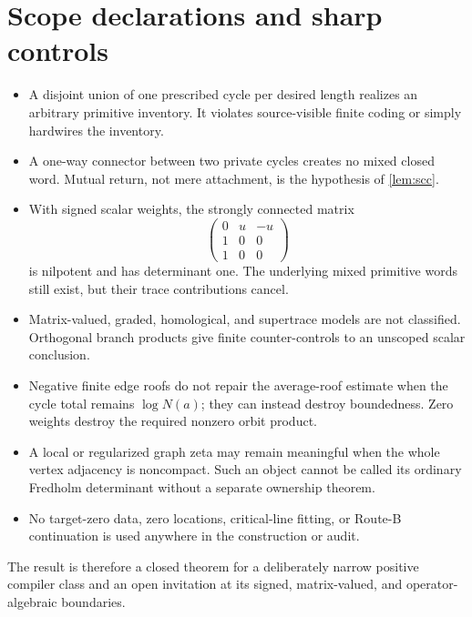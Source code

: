 \section{Scope declarations and sharp controls}

\begin{itemize}
\item A disjoint union of one prescribed cycle per desired length realizes
an arbitrary primitive inventory.  It violates source-visible finite coding
or simply hardwires the inventory.
\item A one-way connector between two private cycles creates no mixed closed
word.  Mutual return, not mere attachment, is the hypothesis of
\cref{lem:scc}.
\item With signed scalar weights, the strongly connected matrix
\[
\begin{pmatrix}0&u&-u\\1&0&0\\1&0&0\end{pmatrix}
\]
is nilpotent and has determinant one.  The underlying mixed primitive words
still exist, but their trace contributions cancel.
\item Matrix-valued, graded, homological, and supertrace models are not
classified.  Orthogonal branch products give finite counter-controls to an
unscoped scalar conclusion.
\item Negative finite edge roofs do not repair the average-roof estimate when
the cycle total remains $\log N(a)$; they can instead destroy boundedness.
Zero weights destroy the required nonzero orbit product.
\item A local or regularized graph zeta may remain meaningful when the whole
vertex adjacency is noncompact.  Such an object cannot be called its ordinary
Fredholm determinant without a separate ownership theorem.
\item No target-zero data, zero locations, critical-line fitting, or Route-B
continuation is used anywhere in the construction or audit.
\end{itemize}

The result is therefore a closed theorem for a deliberately narrow positive
compiler class and an open invitation at its signed, matrix-valued, and
operator-algebraic boundaries.
